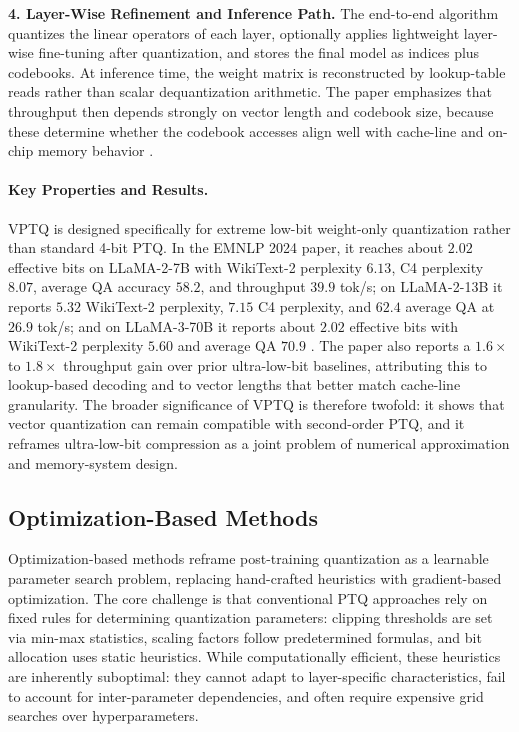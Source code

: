 \textbf{4. Layer-Wise Refinement and Inference Path.} The end-to-end algorithm quantizes the linear operators of each layer, optionally applies lightweight layer-wise fine-tuning after quantization, and stores the final model as indices plus codebooks. At inference time, the weight matrix is reconstructed by lookup-table reads rather than scalar dequantization arithmetic. The paper emphasizes that throughput then depends strongly on vector length and codebook size, because these determine whether the codebook accesses align well with cache-line and on-chip memory behavior \cite{liu2024vptq}.

\paragraph{Key Properties and Results.}
VPTQ is designed specifically for extreme low-bit weight-only quantization rather than standard 4-bit PTQ. In the EMNLP 2024 paper, it reaches about $2.02$ effective bits on LLaMA-2-7B with WikiText-2 perplexity $6.13$, C4 perplexity $8.07$, average QA accuracy $58.2$, and throughput $39.9$ tok/s; on LLaMA-2-13B it reports $5.32$ WikiText-2 perplexity, $7.15$ C4 perplexity, and $62.4$ average QA at $26.9$ tok/s; and on LLaMA-3-70B it reports about $2.02$ effective bits with WikiText-2 perplexity $5.60$ and average QA $70.9$ \cite{liu2024vptq}. The paper also reports a $1.6\times$ to $1.8\times$ throughput gain over prior ultra-low-bit baselines, attributing this to lookup-based decoding and to vector lengths that better match cache-line granularity. The broader significance of VPTQ is therefore twofold: it shows that vector quantization can remain compatible with second-order PTQ, and it reframes ultra-low-bit compression as a joint problem of numerical approximation and memory-system design.
\subsection{Optimization-Based Methods}

Optimization-based methods reframe post-training quantization as a learnable parameter search problem, replacing hand-crafted heuristics with gradient-based optimization. The core challenge is that conventional PTQ approaches rely on fixed rules for determining quantization parameters: clipping thresholds are set via min-max statistics, scaling factors follow predetermined formulas, and bit allocation uses static heuristics. While computationally efficient, these heuristics are inherently suboptimal: they cannot adapt to layer-specific characteristics, fail to account for inter-parameter dependencies, and often require expensive grid searches over hyperparameters.

